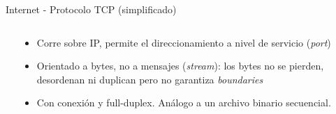 \begin{frame}[fragile]{Internet - Protocolo TCP (simplificado)}
   \begin{columns}
       \begin{column}{.4\linewidth}
       \end{column}
      \begin{column}{.6\linewidth}
        \begin{itemize}
            \item<1-> Corre sobre IP, permite el direccionamiento a nivel de servicio (\textit{port})
            \item<2-> Orientado a bytes, no a mensajes (\textit{stream}): los bytes no se pierden, desordenan ni duplican \alert{pero no garantiza \textit{boundaries}}
            \item<3-> Con conexi\'on y full-duplex. \alert{An\'alogo a un archivo binario secuencial.}
        \end{itemize}
      \end{column}
   \end{columns}
\end{frame}
